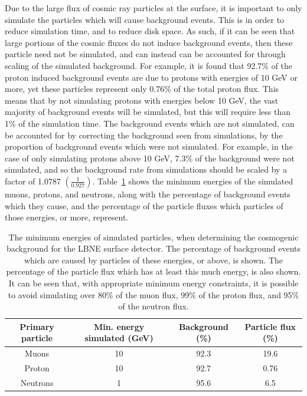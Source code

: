 Due to the large flux of cosmic ray particles at the surface, it is important to only simulate the particles which will cause background events. This is in order to reduce simulation time, and to reduce disk space. As such, if it can be seen that large portions of the cosmic fluxes do not induce background events, then these particle need not be simulated, and can instead can be accounted for through scaling of the simulated background. For example, it is found that 92.7\% of the proton induced background events are due to protons with energies of 10 GeV or more, yet these particles represent only 0.76\% of the total proton flux. This means that by not simulating protons with energies below 10 GeV, the vast majority of background events will be simulated, but this will require less than 1\% of the simulation time. The background events which are not simulated, can be accounted for by correcting the background seen from simulations, by the proportion of background events which were not simulated. For example, in the case of only simulating protons above 10 GeV, 7.3\% of the background were not simulated, and so the background rate from simulations should be scaled by a factor of 1.0787 $\left(\frac{1}{0.927}\right)$. Table~\ref{tab:SurfEnPrim} shows the minimum energies of the simulated muons, protons, and neutrons, along with the percentage of background events which they cause, and the percentage of the particle fluxes which particles of those energies, or more, represent. \\
\begin{table}
  \caption[The minimum energies of simulated particles, when determining the cosmogenic background for the LBNE surface detector]
          {The minimum energies of simulated particles, when determining the cosmogenic background for the LBNE surface detector. The percentage of background events which are caused by particles of these energies, or above, is shown. The percentage of the particle flux which has at least this much energy, is also shown. It can be seen that, with appropriate minimum energy constraints, it is possible to avoid simulating over 80\% of the muon flux, 99\% of the proton flux, and 95\% of the neutron flux.}
  \centering
  \label{tab:SurfEnPrim}
  \begin{tabular}{c c c c}
    \toprule
        {Primary particle} & {Min. energy simulated (GeV)} & {Background (\%)} & {Particle flux (\%)} \\ 
        \midrule
        Muons              & 10                            & 92.3              & 19.6                 \\

        Proton             & 10                            & 92.7              & 0.76                 \\

        Neutrons           & 1                             & 95.6              & 6.5                  \\
    \bottomrule
  \end{tabular}
\end{table}

